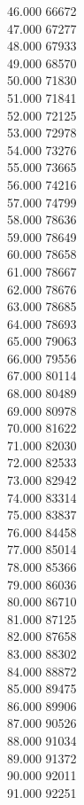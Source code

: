 { 46.000	66672 \\
 47.000	67277 \\
 48.000	67933 \\
 49.000	68570 \\
 50.000	71830 \\
 51.000	71841 \\
 52.000	72125 \\
 53.000	72978 \\
 54.000	73276 \\
 55.000	73665 \\
 56.000	74216 \\
 57.000	74799 \\
 58.000	78636 \\
 59.000	78649 \\
 60.000	78658 \\
 61.000	78667 \\
 62.000	78676 \\
 63.000	78685 \\
 64.000	78693 \\
 65.000	79063 \\
 66.000	79556 \\
 67.000	80114 \\
 68.000	80489 \\
 69.000	80978 \\
 70.000	81622 \\
 71.000	82030 \\
 72.000	82533 \\
 73.000	82942 \\
 74.000	83314 \\
 75.000	83837 \\
 76.000	84458 \\
 77.000	85014 \\
 78.000	85366 \\
 79.000	86036 \\
 80.000	86710 \\
 81.000	87125 \\
 82.000	87658 \\
 83.000	88302 \\
 84.000	88872 \\
 85.000	89475 \\
 86.000	89906 \\
 87.000	90526 \\
 88.000	91034 \\
 89.000	91372 \\
 90.000	92011 \\
 91.000	92251 \\
}
